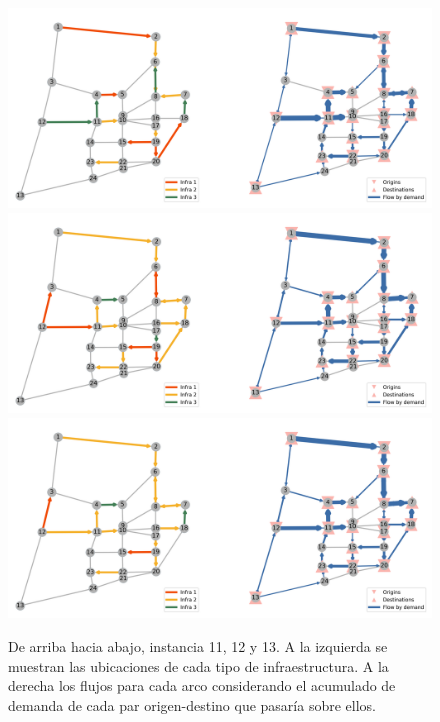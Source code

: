 \documentclass{article}
\begin{document}
  \begin{figure}[h!]
    \centering
    \includegraphics[width=12cm]{../resources/sioux_falls_0.4_budget_factor_linear_5_breakpoints.png}
    \includegraphics[width=12cm]{../resources/sioux_falls_0.4_budget_factor_linear_20_breakpoints.png}
    \includegraphics[width=12cm]{../resources/sioux_falls_0.4_budget_factor_linear_50_breakpoints.png}
      \caption{De arriba hacia abajo, instancia 11, 12 y 13. A la izquierda se muestran las ubicaciones de cada tipo de infraestructura. A la derecha los flujos para cada arco considerando el acumulado de demanda de cada par origen-destino que pasaría sobre ellos.}
    \label{fig:sensibilityinstance11_12_13}
  \end{figure}
\end{document}
